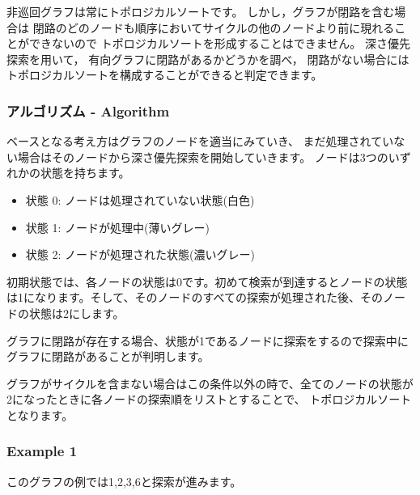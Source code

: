 非巡回グラフは常にトポロジカルソートです。
しかし，グラフが閉路を含む場合は
閉路のどのノードも順序においてサイクルの他のノードより前に現れることができないので
トポロジカルソートを形成することはできません。
深さ優先探索を用いて，
有向グラフに閉路があるかどうかを調べ，
閉路がない場合にはトポロジカルソートを構成することができると判定できます。

\subsubsection{アルゴリズム - Algorithm}

ベースとなる考え方はグラフのノードを適当にみていき、
まだ処理されていない場合はそのノードから深さ優先探索を開始していきます。
ノードは3つのいずれかの状態を持ちます。

\begin{itemize}
\item 状態 0: ノードは処理されていない状態(白色)
\item 状態 1: ノードが処理中(薄いグレー)
\item 状態 2: ノードが処理された状態(濃いグレー)
\end{itemize}

初期状態では、各ノードの状態は0です。初めて検索が到達するとノードの状態は1になります。そして、そのノードのすべての探索が処理された後、そのノードの状態は2にします。

グラフに閉路が存在する場合、状態が1であるノードに探索をするので探索中にグラフに閉路があることが判明します。

グラフがサイクルを含まない場合はこの条件以外の時で、全てのノードの状態が2になったときに各ノードの探索順をリストとすることで、
トポロジカルソートとなります。

\subsubsection{Example 1}

このグラフの例では1,2,3,6と探索が進みます。

\begin{center}
\end{center}

